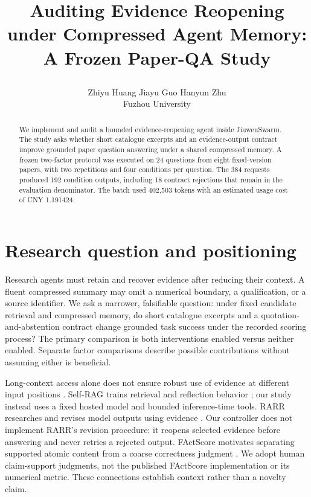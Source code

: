 \documentclass{article}
\title{\raggedright Auditing Evidence Reopening\\under Compressed Agent Memory:\\A Frozen Paper-QA Study}
\author{Zhiyu Huang \quad Jiayu Guo \quad Hanyun Zhu\\Fuzhou University}
\begin{document}
\maketitle
{}
\begin{abstract}
We implement and audit a bounded evidence-reopening agent inside JiuwenSwarm. The study asks whether short catalogue excerpts and an evidence-output contract improve grounded paper question answering under a shared compressed memory. A frozen two-factor protocol was executed on 24 questions from eight fixed-version papers, with two repetitions and four conditions per question. The 384 requests produced 192 condition outputs, including 18 contract rejections that remain in the evaluation denominator. The batch used 402,503 tokens with an estimated usage cost of CNY 1.191424. %
\end{abstract}

\section{Research question and positioning}
Research agents must retain and recover evidence after reducing their context. A fluent compressed summary may omit a numerical boundary, a qualification, or a source identifier. We ask a narrower, falsifiable question: under fixed candidate retrieval and compressed memory, do short catalogue excerpts and a quotation-and-abstention contract change grounded task success under the recorded scoring process? The primary comparison is both interventions enabled versus neither enabled. Separate factor comparisons describe possible contributions without assuming either is beneficial.

Long-context access alone does not ensure robust use of evidence at different input positions \citep{liu2024}. Self-RAG trains retrieval and reflection behavior \citep{asai2023}; our study instead uses a fixed hosted model and bounded inference-time tools. RARR researches and revises model outputs using evidence \citep{gao2023}. Our controller does not implement RARR's revision procedure: it reopens selected evidence before answering and never retries a rejected output. FActScore motivates separating supported atomic content from a coarse correctness judgment \citep{min2023}. We adopt human claim-support judgments, not the published FActScore implementation or its numerical metric. These connections establish context rather than a novelty claim.
\end{document}
